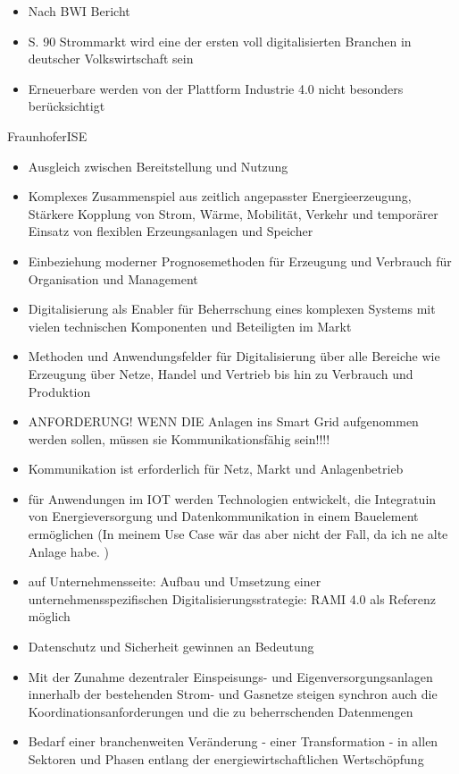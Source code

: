 \begin{itemize}
  \item Nach BWI Bericht
  \item S. 90 Strommarkt wird eine der ersten voll digitalisierten Branchen in deutscher Volkswirtschaft sein
  \item Erneuerbare werden von der Plattform Industrie 4.0 nicht besonders berücksichtigt
\end{itemize}

FraunhoferISE

\begin{itemize}
  \item Ausgleich zwischen Bereitstellung und Nutzung
  \item Komplexes Zusammenspiel aus zeitlich angepasster Energieerzeugung, Stärkere Kopplung von Strom, Wärme, Mobilität, Verkehr und temporärer Einsatz von flexiblen Erzeungsanlagen  und Speicher
  \item Einbeziehung moderner Prognosemethoden für Erzeugung und Verbrauch für Organisation und Management
  \item Digitalisierung als Enabler für Beherrschung eines komplexen Systems mit vielen technischen Komponenten und Beteiligten im Markt
  \item Methoden und Anwendungsfelder für Digitalisierung über alle Bereiche wie Erzeugung über Netze, Handel und Vertrieb bis hin zu Verbrauch und Produktion
  \item ANFORDERUNG! WENN DIE Anlagen ins Smart Grid aufgenommen werden sollen, müssen sie Kommunikationsfähig sein!!!!
  \item Kommunikation ist erforderlich für Netz, Markt und Anlagenbetrieb
  \item für Anwendungen im IOT werden Technologien entwickelt, die Integratuin von Energieversorgung und Datenkommunikation in einem Bauelement ermöglichen (In meinem Use Case wär das aber nicht der Fall, da ich ne alte Anlage habe. )
\end{itemize}



\begin{itemize}

  \item auf Unternehmensseite: Aufbau und Umsetzung einer unternehmensspezifischen Digitalisierungsstrategie: RAMI 4.0 als Referenz möglich
   \item Datenschutz und Sicherheit gewinnen an Bedeutung
  \item \glqq Mit der Zunahme dezentraler Einspeisungs- und Eigenversorgungsanlagen innerhalb der bestehenden Strom- und Gasnetze steigen synchron auch die Koordinationsanforderungen und die zu beherrschenden Datenmengen \grqq{} \citep[S. 7]{Doleski2016}
  \item \glqq Bedarf einer branchenweiten Veränderung - einer Transformation - in allen Sektoren und Phasen entlang der energiewirtschaftlichen Wertschöpfung\grqq{} \cite[S. 11]{Doleski2016}
\end{itemize}

